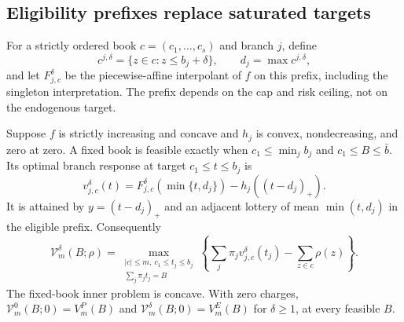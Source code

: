 \subsection{Eligibility prefixes replace saturated targets}
For a strictly ordered book $c=(c_1,\ldots,c_s)$ and branch $j$, define
\[
 c^{j,\delta}=\{z\in c:z\leq b_j+\delta\},\qquad
 d_j=\max c^{j,\delta},
\]
and let $F_{j,c}^\delta$ be the piecewise-affine interpolant of $f$ on this prefix, including the singleton interpretation. The prefix depends on the cap and risk ceiling, not on the endogenous target.
\begin{theorem}\label{thm:eligible}
Suppose $f$ is strictly increasing and concave and $h_j$ is convex, nondecreasing, and zero at zero. A fixed book is feasible exactly when $c_1\leq\min_jb_j$ and $c_1\leq B\leq\bar b$. Its optimal branch response at target $c_1\leq t\leq b_j$ is
\begin{equation}\label{eq:prefix-response}
 v_{j,c}^\delta(t)=F_{j,c}^\delta(\min\{t,d_j\})-h_j((t-d_j)_+).
\end{equation}
It is attained by $y=(t-d_j)_+$ and an adjacent lottery of mean $\min(t,d_j)$ in the eligible prefix. Consequently
\begin{equation}\label{eq:unified-allocation}
 \mathcal V_m^\delta(B;\rho)=
 \max_{\substack{|c|\leq m,\ c_1\leq t_j\leq b_j\\\sum_j\pi_jt_j=B}}
 \left\{\sum_j\pi_jv_{j,c}^\delta(t_j)-\sum_{z\in c}\rho(z)\right\}.
\end{equation}
The fixed-book inner problem is concave. With zero charges, $\mathcal V_m^0(B;0)=V_m^P(B)$ and $\mathcal V_m^\delta(B;0)=V_m^E(B)$ for $\delta\geq1$, at every feasible $B$.
\end{theorem}

